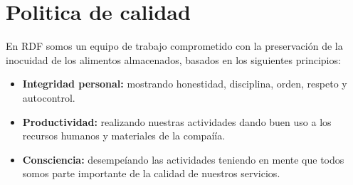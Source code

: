 \renewcommand{\MayorVer}{2}
\renewcommand{\MenorVer}{0}
\renewcommand{\Codigo}{BPD-1-POL}
\renewcommand{\FechaPub}{2023--01}
\renewcommand{\Titulo}{Politica de calidad}


\section{\Titulo} 

En \Gls{RDF} somos un equipo de trabajo comprometido con la preservación de la inocuidad de los alimentos almacenados, basados en los siguientes principios:

\begin{itemize}
	\item \textbf{Integridad personal:} mostrando honestidad, disciplina, orden, respeto y autocontrol.
	\item \textbf{Productividad:} realizando nuestras actividades dando buen uso a los recursos humanos y materiales de la compaíía.
	\item \textbf{Consciencia:} desempeíando las actividades teniendo en mente que todos somos parte importante de la calidad de nuestros servicios.
\end{itemize}